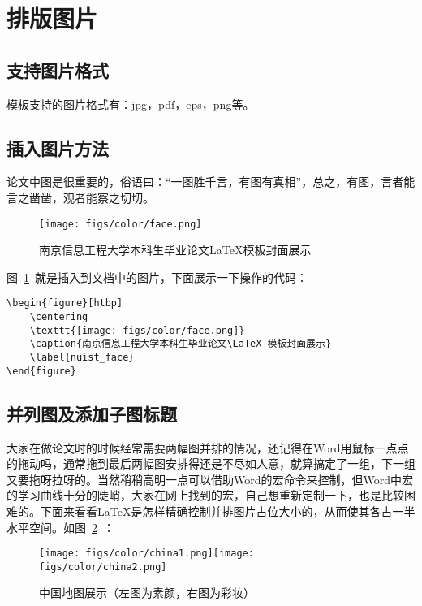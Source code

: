 \section{排版图片}

\subsection{支持图片格式}

模板支持的图片格式有：jpg，pdf，eps，png等。

\subsection{插入图片方法}

论文中图是很重要的，俗语曰：“一图胜千言，有图有真相”，总之，有图，言者能言之凿凿，观者能察之切切。

\begin{figure}[htbp]
    \centering
    \texttt{[image: figs/color/face.png]}
    \caption{南京信息工程大学本科生毕业论文\LaTeX 模板封面展示}
    \label{nuist_face}
\end{figure}

图~\ref{nuist_face}~就是插入到文档中的图片，下面展示一下操作的代码：

{\color{green!50!black}
\begin{lstlisting}[breaklines=true,]
\begin{figure}[htbp]
    \centering
    \texttt{[image: figs/color/face.png]}
    \caption{南京信息工程大学本科生毕业论文\LaTeX 模板封面展示}
    \label{nuist_face}
\end{figure}
\end{lstlisting}
}

\subsection{并列图及添加子图标题}

大家在做论文时的时候经常需要两幅图并排的情况，还记得在Word用鼠标一点点的拖动吗，通常拖到最后两幅图安排得还是不尽如人意，就算搞定了一组，下一组又要拖呀拉呀的。当然稍稍高明一点可以借助Word的宏命令来控制，但Word中宏的学习曲线十分的陡峭，大家在网上找到的宏，自己想重新定制一下，也是比较困难的。下面来看看\LaTeX 是怎样精确控制并排图片占位大小的，从而使其各占一半水平空间。如图~\ref{cn_map}~：

\begin{figure}[htbp!]
    \centering
    \texttt{[image: figs/color/china1.png]}\texttt{[image: figs/color/china2.png]}
    \caption{中国地图展示（左图为素颜，右图为彩妆）}
    \label{cn_map}
\end{figure}

